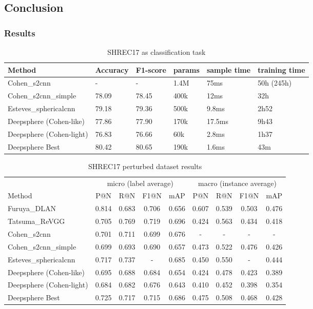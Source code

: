 \documentclass[11pt]{report}
\begin{document}
\subsection{Conclusion}

\subsubsection{Results}
\begin{table}[ht]
    \centering
    \begin{tabular}{l|l l|l l l}
        Method & Accuracy & F1-score & params & sample time & training time \\ \hline
        Cohen\_s2cnn & - & - & 1.4M & 75ms & 50h (245h)\\
        Cohen\_s2cnn\_simple & 78.09 & 78.45 & 400k & 12ms & 32h\\
        Esteves\_sphericalcnn & 79.18 & 79.36 & 500k & 9.8ms & 2h52\\ \hline
        Deepsphere (Cohen-like) & 77.86 & 77.90 & 170k & 17.5ms & 9h43\\
        Deepsphere (Cohen-light) & 76.83 & 76.66 & 60k & 2.8ms & 1h37\\
        Deepsphere Best & 80.42 & 80.65 & 190k & 1.6ms & 43m
    \end{tabular}
    \caption{SHREC17 as classification task}
    \label{tab:SHREC17_class}
\end{table}

\begin{table}[ht]
    \centering
    \begin{tabular}{l|c c c c|c c c c}
         & \multicolumn{4}{c|}{micro (label average)} & \multicolumn{4}{c}{macro (instance average)} \\
        Method & P@N & R@N & F1@N & mAP & P@N & R@N & F1@N & mAP \\ \hline
        Furuya\_DLAN & 0.814 & 0.683 & 0.706 & 0.656 & 0.607 & 0.539 & 0.503 & 0.476 \\
        Tatsuma\_ReVGG & 0.705 & 0.769 & 0.719 & 0.696 & 0.424 & 0.563 & 0.434 & 0.418\\ \hline
        Cohen\_s2cnn & 0.701 & 0.711 & 0.699 & 0.676 & - & - & - & - \\
        Cohen\_s2cnn\_simple & 0.699 & 0.693 & 0.690 & 0.657 & 0.473 & 0.522 & 0.476 & 0.426\\
        Esteves\_sphericalcnn & 0.717 & 0.737 & - & 0.685 & 0.450 & 0.550 & - & 0.444\\ \hline
        Deepsphere (Cohen-like) & 0.695 & 0.688 & 0.684 & 0.654 & 0.424 & 0.478 & 0.423 & 0.389\\
        Deepsphere (Cohen-light) & 0.684 & 0.682 & 0.676 & 0.643 & 0.410 & 0.452 & 0.398 & 0.354 \\
        Deepsphere Best & 0.725 & 0.717 & 0.715 & 0.686 & 0.475 & 0.508 & 0.468 & 0.428
    \end{tabular}
    \caption{SHREC17 perturbed dataset results}
    \label{tab:SHREC17_retriev}
\end{table}
\end{document}

